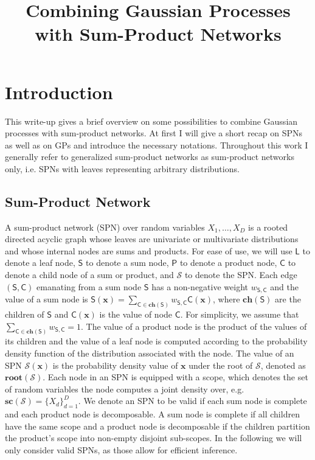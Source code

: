 \documentclass[10pt,letterpaper]{article}
\newcommand{\SPN}{\mathcal{S}}
\newcommand{\x}{\mathbf{x}}
\newcommand{\ProductNode}{\mathsf{P}}
\newcommand{\SumNode}{\mathsf{S}}
\newcommand{\Leaf}{\mathsf{L}}
\newcommand{\Child}{\mathsf{C}}
\newcommand{\Root}{\ensuremath{\mathbf{root}}}
\newcommand{\ch}{\ensuremath{\mathbf{ch}}}
\newcommand{\scope}{\ensuremath{\mathbf{sc}}} %
\newcommand{\w}{w}
\theoremstyle{mystyle}
\begin{document}
\title{Combining Gaussian Processes with Sum-Product Networks}
\author{}

\maketitle
\section{Introduction}
This write-up gives a brief overview on some possibilities to combine Gaussian processes with sum-product networks.
At first I will give a short recap on SPNs as well as on GPs and introduce the necessary notations. Throughout this work I generally refer to generalized sum-product networks \cite{Peharz2015} as sum-product networks only, i.e. SPNs with leaves representing arbitrary distributions.

\subsection{Sum-Product Network}
\label{sec:spns}
A sum-product network (SPN) \cite{Poon2011} over random variables $X_1, \dots, X_D$ is a rooted directed acyclic graph whose leaves are univariate or multivariate distributions and whose internal nodes are sums and products. 
For ease of use, we will use $\Leaf$ to denote a leaf node, $\SumNode$ to denote a sum node, $\ProductNode$ to denote a product node, $\Child$ to denote a child node of a sum or product, and $\SPN$ to denote the SPN.
Each edge $(\SumNode,\Child)$ emanating from a sum node $\SumNode$ has a non-negative weight $\w_{\SumNode,\Child}$ and the value of a sum node is $\SumNode(\x) = \sum_{\Child \in \ch(\SumNode)} \w_{\SumNode,\Child} \Child(\x)$, where $\ch(\SumNode)$ are the children of $\SumNode$ and $\Child(\x)$ is the value of node $\Child$. For simplicity, we assume that $\sum_{\Child \in \ch(\SumNode)} \w_{\SumNode,\Child} = 1$. The value of a product node is the product of the values of its children and the value of a leaf node is computed according to the probability density function of the distribution associated with the node. 
The value of an SPN $\SPN(\x)$ is the probability density value of $\x$ under the root of $\SPN$, denoted as $\Root(\SPN)$.
Each node in an SPN is equipped with a scope, which denotes the set of random variables the node computes a joint density over, e.g. $\scope(\SPN) = \{X_d\}_{d=1}^D$.
We denote an SPN to be valid if each sum node is complete and each product node is decomposable.
A sum node is complete if all children have the same scope and a product node is decomposable if the children partition the product's scope into non-empty disjoint sub-scopes.
In the following we will only consider valid SPNs, as those allow for efficient inference.
\end{document}
